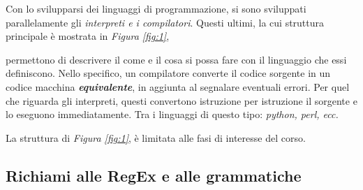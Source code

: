 \documentclass{subfiles}
\begin{document}
Con lo svilupparsi dei linguaggi di programmazione, si sono sviluppati parallelamente gli \emph{interpreti \emph{e i} compilatori}.
Questi ultimi, la cui struttura principale è mostrata in \emph{Figura \ref{fig:1}},

permettono di descrivere il come e il cosa si possa fare con il linguaggio che essi definiscono.
Nello specifico, un compilatore converte il codice sorgente in un codice macchina \emph\textbf{equivalente},
in aggiunta al segnalare eventuali errori.
Per quel che riguarda gli interpreti, questi convertono istruzione per istruzione il sorgente e lo eseguono immediatamente.
Tra i linguaggi di questo tipo: \emph{python, perl, ecc.}

\begin{Remark*}
    La struttura di \emph{Figura \ref{fig:1}}, è limitata alle fasi di interesse del corso.
\end{Remark*}

\subsection{Richiami alle RegEx e alle grammatiche}

\clearpage
\end{document}

